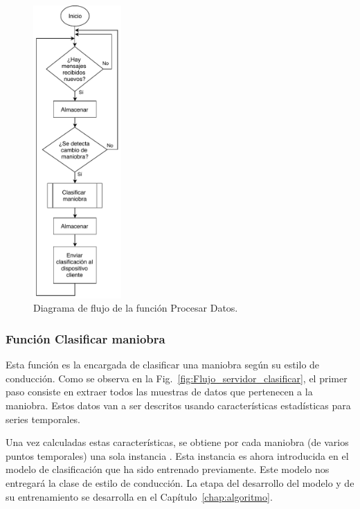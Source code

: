 \begin{figure}[bth!]
\centering
\includegraphics[width=0.3\textwidth]{Flujo_servidor_procesar.pdf}
\caption{Diagrama de flujo de la función Procesar Datos.}
\label{fig:Flujo_servidor_procesar}
\end{figure}

\subsubsection{Función Clasificar maniobra}
Esta función es la encargada de clasificar una maniobra según su estilo de conducción. Como se observa en la Fig.~\ref{fig:Flujo_servidor_clasificar}, el primer paso consiste en extraer todos las muestras de datos que pertenecen a la maniobra. Estos datos van a ser descritos usando características estadísticas para series temporales.

Una vez calculadas estas características, se obtiene por cada maniobra (de varios puntos temporales) una sola instancia . Esta instancia es ahora introducida en el modelo de clasificación que ha sido entrenado previamente. Este modelo nos entregará la clase de estilo de conducción. La etapa del desarrollo del modelo y de su entrenamiento se desarrolla en el Capítulo~\ref{chap:algoritmo}.


